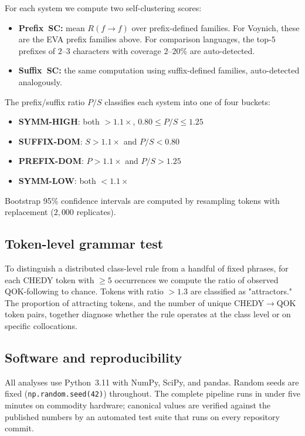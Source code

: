 \documentclass[11pt]{article}
\begin{document}
For each system we compute two self-clustering scores:

\begin{itemize}
  \item \textbf{Prefix~SC:} mean $R(f \to f)$ over prefix-defined families.
        For Voynich, these are the EVA prefix families above. For comparison
        languages, the top-$5$ prefixes of $2$--$3$ characters with coverage
        $2$--$20\%$ are auto-detected.
  \item \textbf{Suffix~SC:} the same computation using suffix-defined
        families, auto-detected analogously.
\end{itemize}

The prefix/suffix ratio $P/S$ classifies each system into one of four
buckets:

\begin{itemize}
  \item \textbf{SYMM-HIGH}: both $> 1.1\times$, $0.80 \leq P/S \leq 1.25$
  \item \textbf{SUFFIX-DOM}: $S > 1.1\times$ and $P/S < 0.80$
  \item \textbf{PREFIX-DOM}: $P > 1.1\times$ and $P/S > 1.25$
  \item \textbf{SYMM-LOW}: both $< 1.1\times$
\end{itemize}

Bootstrap 95\% confidence intervals are computed by resampling tokens with
replacement ($2{,}000$ replicates).

\subsection{Token-level grammar test}

To distinguish a distributed class-level rule from a handful of fixed
phrases, for each CHEDY token with $\geq 5$ occurrences we compute the
ratio of observed QOK-following to chance. Tokens with ratio $> 1.3$ are
classified as "attractors." The proportion of attracting tokens, and the
number of unique CHEDY$\to$QOK token pairs, together diagnose whether the
rule operates at the class level or on specific collocations.

\subsection{Software and reproducibility}

All analyses use Python~3.11 with NumPy, SciPy, and pandas. Random seeds are
fixed (\texttt{np.random.seed(42)}) throughout. The complete pipeline runs
in under five minutes on commodity hardware; canonical values are verified
against the published numbers by an automated test suite that runs on every
repository commit.
\end{document}
